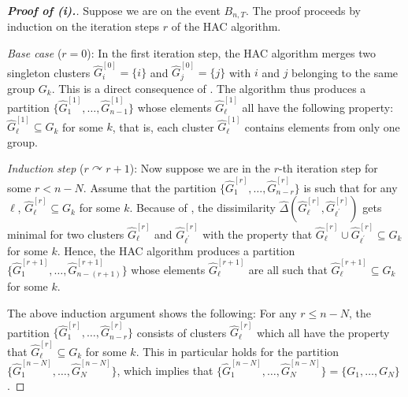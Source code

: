 \documentclass[a4paper,12pt]{article}
\makeatletter
\renewcommand{\eqref}[1]{\tagform@{\ref{#1}}}
\makeatother
\begin{document}
\begin{proof}[\textnormal{\textbf{Proof of (i).}}]
Suppose we are on the event $B_{n,T}$. The proof proceeds by induction on the iteration steps $r$ of the HAC algorithm. 
\vspace{7pt}

\textit{Base case} ($r=0$): In the first iteration step, the HAC algorithm merges two singleton clusters $\widehat{G}_i^{[0]} = \{ i \}$ and $\widehat{G}_j^{[0]} = \{ j \}$ with $i$ and $j$ belonging to the same group $G_k$. This is a direct consequence of \eqref{eq1-prop-clustering-1}. The algorithm thus produces a partition $\{ \widehat{G}_1^{[1]},\ldots,\widehat{G}_{n-1}^{[1]} \}$ whose elements $\widehat{G}_\ell^{[1]}$ all have the following property: $\widehat{G}_\ell^{[1]} \subseteq G_k$ for some $k$, that is, each cluster $\widehat{G}_\ell^{[1]}$ contains elements from only one group. 
\vspace{7pt}

\textit{Induction step} ($r \curvearrowright r+1$): Now suppose we are in the $r$-th iteration step for some $r < n-N$. Assume that the partition $\{\widehat{G}_1^{[r]},\ldots,\widehat{G}_{n-r}^{[r]}\}$ is such that for any $\ell$, $\widehat{G}_\ell^{[r]} \subseteq G_k$ for some $k$. Because of \eqref{eq1-prop-clustering-1}, the dissimilarity $\widehat{\Delta}(\widehat{G}_\ell^{[r]},\widehat{G}_{\ell^\prime}^{[r]})$ gets minimal for two clusters $\widehat{G}_\ell^{[r]}$ and $\widehat{G}_{\ell^\prime}^{[r]}$ with the property that $\widehat{G}_\ell^{[r]} \cup \widehat{G}_{\ell^\prime}^{[r]} \subseteq G_k$ for some $k$. Hence, the HAC algorithm produces a partition $\{ \widehat{G}_1^{[r+1]},\ldots,\widehat{G}_{n-(r+1)}^{[r+1]} \}$ whose elements $\widehat{G}_\ell^{[r+1]}$ are all such that $\widehat{G}_\ell^{[r+1]} \subseteq G_k$ for some $k$. 
\vspace{7pt}

The above induction argument shows the following: For any $r \le n - N$, the partition $\{ \widehat{G}_1^{[r]},\ldots,\widehat{G}_{n-r}^{[r]} \}$ consists of clusters $\widehat{G}_\ell^{[r]}$ which all have the property that $\widehat{G}_\ell^{[r]} \subseteq G_k$ for some $k$. This in particular holds for the partition $\{ \widehat{G}_1^{[n-N]},\ldots,\widehat{G}_N^{[n-N]} \}$, which implies that $\{ \widehat{G}_1^{[n-N]},\ldots,\widehat{G}_N^{[n-N]} \} =\{ G_1,\ldots,G_N \}$.  
\end{proof}
\end{document}

